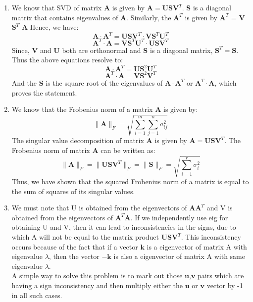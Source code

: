 \documentclass{article}
\begin{document}
\begin{enumerate}
    \begin{enumerate}
        \item We know that SVD of matrix \textbf{A} is given by $\textbf{A} = \textbf{U} \textbf{S} \textbf{V}^T$. \textbf{S} is a diagonal matrix that contains eigenvalues of \textbf{A}. Similarly, the $\textbf{A}^T$ is given by $\textbf{A}^T$ = \textbf{V} $\textbf{S}^T$ \textbf{A}
        Hence, we have:
        \[
            \textbf{A}\cdot \textbf{A}^T = \textbf{U} \textbf{S} \textbf{V}^T \cdot \textbf{V} \textbf{S}^T \textbf{U}^T
        \]
        \[
            \textbf{A}^T \cdot \textbf{A} = \textbf{V} \textbf{S}^T \textbf{U}^T \cdot \textbf{U} \textbf{S} \textbf{V}^T
        \]
        Since, \textbf{V} and \textbf{U} both are orthonormal and \textbf{S} is a diagonal matrix, $\textbf{S}^T = \textbf{S}$. Thus the above equations resolve to:
        \[
            \textbf{A}\cdot \textbf{A}^T = \textbf{U} \textbf{S}^2 \textbf{U}^T
        \]
        \[
            \textbf{A}^T\cdot \textbf{A} = \textbf{V} \textbf{S}^2 \textbf{V}^T
        \]
        And the \textbf{S} is the square root of the eigenvalues of $\textbf{A}\cdot \textbf{A}^T$ or $\textbf{A}^T\cdot \textbf{A}$, which proves the statement.
        \item We know that the Frobenius norm of a matrix \textbf{A} is given by:
        \begin{equation}
            \|\textbf{A}\|_F = \sqrt{\sum_{i=1}^{m} \sum_{j=1}^{n} a_{ij}^2}
        \end{equation}
        The singular value decomposition of matrix \textbf{A} is given by $\textbf{A} = \textbf{U} \textbf{S} \textbf{V}^T$. The Frobenius norm of matrix \textbf{A} can be written as:
        \begin{equation}
            \|\textbf{A}\|_F = \|\textbf{U} \textbf{S} \textbf{V}^T\|_F = \|\textbf{S}\|_F = \sqrt{\sum_{i=1}^{r} \sigma_i^2}
        \end{equation}
        Thus, we have shown that the squared Frobenius norm of a matrix is equal to the sum of squares of its singular values.
        \item We must note that U is obtained from the eigenvectors of $\boldsymbol{A} \boldsymbol{A}^T$ and V is obtained from the eigenvectors of $\boldsymbol{A}^T\boldsymbol{A}$. If we independently use eig for obtaining U and V, then it can lead to inconsistencies in the signs, due to which A will not be equal to the matrix product $\boldsymbol{US}\boldsymbol{V}^T$. This inconsistency occurs because of the fact that if a vector $\boldsymbol{k}$ is a eigenvector of matrix A with eigenvalue $\lambda$, then the vector $\boldsymbol{-k}$ is also a eigenvector of matrix A with same eigenvalue $\lambda$. \\ A simple way to solve this problem is to mark out those $\boldsymbol{u}$,$\boldsymbol{v}$ pairs which are having a sign inconsistency and then multiply either the $\boldsymbol{u}$ or $\boldsymbol{v}$ vector by -1 in all such cases.

\end{enumerate}
\end{enumerate}
\end{document}
